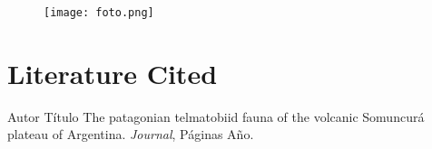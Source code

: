 \documentclass[11pt,a4paper,oneside]{article}
\title{}
\date{}
\author{}
\begin{document}
\maketitle



\vfill
\begin{figure}[h] %
\centering
\texttt{[image: foto.png]}
\caption{}
\end{figure}
\vfill




\newpage

\section*{Literature Cited}
\begingroup
\renewcommand{\section}[2]{}%
\begin{thebibliography}{6} %

	Autor
	Título The patagonian telmatobiid fauna of the volcanic Somuncurá plateau of Argentina.
	\textit{Journal},
	Páginas %
	Año.
	
\end{thebibliography}
\endgroup
\end{document}
